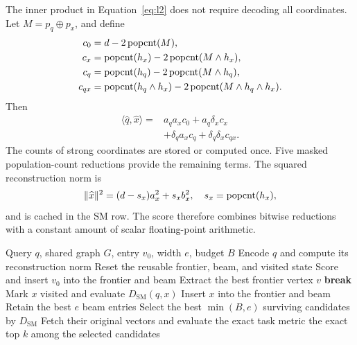 The inner product in Equation~\eqref{eq:l2} does not require decoding all coordinates. Let $M=p_q\oplus p_x$, and define
\begin{align}
 c_0&=d-2\operatorname{popcnt}(M),\\
 c_x&=\operatorname{popcnt}(h_x)-2\operatorname{popcnt}(M\land h_x),\\
 c_q&=\operatorname{popcnt}(h_q)-2\operatorname{popcnt}(M\land h_q),\\
 c_{qx}&=\operatorname{popcnt}(h_q\land h_x)-2\operatorname{popcnt}(M\land h_q\land h_x).
\end{align}
Then
\begin{equation}
\begin{split}
\langle\widehat q,\widehat x\rangle
={}&a_q a_x c_0+a_q\delta_x c_x\\
&+\delta_q a_x c_q+\delta_q\delta_x c_{qx}.
\end{split}
\label{eq:bitdot}
\end{equation}
The counts of strong coordinates are stored or computed once. Five masked population-count reductions provide the remaining terms. The squared reconstruction norm is
\begin{equation}
    \|\widehat x\|^2=(d-s_x)a_x^2+s_xb_x^2,
    \quad s_x=\operatorname{popcnt}(h_x),
\end{equation}
and is cached in the SM row. The score therefore combines bitwise reductions with a constant amount of scalar floating-point arithmetic.

\begin{algorithm}[t]
\caption{QuIVer query with bounded exact reranking}
\label{alg:query}
\begin{algorithmic}[1]
\Require Query $q$, shared graph $G$, entry $v_0$, width $e$, budget $B$
\State Encode $q$ and compute its reconstruction norm
\State Reset the reusable frontier, beam, and visited state
\State Score and insert $v_0$ into the frontier and beam
    \State Extract the best frontier vertex $v$
        \State \textbf{break}
    \EndIf
        \State Mark $x$ visited and evaluate $D_{\mathrm{SM}}(q,x)$
            \State Insert $x$ into the frontier and beam
            \State Retain the best $e$ beam entries
        \EndIf
    \EndFor
\EndWhile
\State Select the best $\min(B,e)$ surviving candidates by $D_{\mathrm{SM}}$
\State Fetch their original vectors and evaluate the exact task metric
\State \Return the exact top $k$ among the selected candidates
\end{algorithmic}
\end{algorithm}

